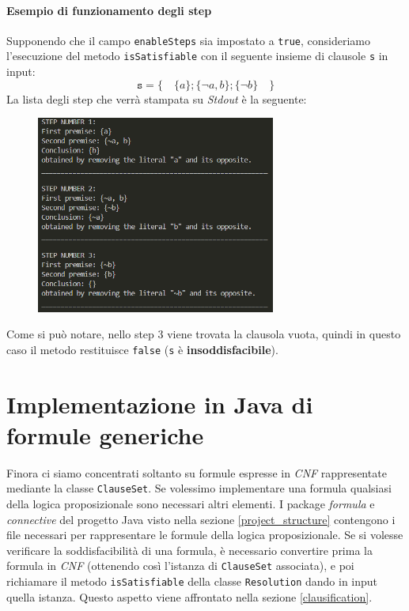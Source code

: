 \documentclass[a4paper,12pt]{report}
\begin{document}
\subsubsection{Esempio di funzionamento degli step}
Supponendo che il campo \texttt{enableSteps} sia impostato a \texttt{true}, consideriamo l'esecuzione del metodo \texttt{isSatisfiable} con il seguente insieme di clausole \texttt{s} in input:
\[\texttt{s} = \{\quad \{a\}; \{\lnot a, b\}; \{\lnot b\} \quad\}\]
La lista degli step che verrà stampata su \emph{Stdout} è la seguente:
\begin{figure}[H]
    \centering
    \includegraphics[width=0.7\textwidth, height=0.4\textheight]{img/step.png}
\end{figure} 
Come si può notare, nello step 3 viene trovata la clausola vuota, quindi in questo caso il metodo restituisce \texttt{false} (\texttt{s} è \textbf{insoddisfacibile}).


% 
% 
\chapter{Implementazione in Java di formule generiche}
\label{formulas}
Finora ci siamo concentrati soltanto su formule espresse in \emph{CNF} rappresentate mediante la classe \texttt{ClauseSet}. Se volessimo implementare una formula qualsiasi della logica proposizionale sono necessari altri elementi. I package \emph{formula} e \emph{connective} del progetto Java visto nella sezione \ref{project_structure} contengono i file necessari per rappresentare le formule della logica proposizionale. Se si volesse verificare la soddisfacibilità di una formula, è necessario convertire prima la formula in \emph{CNF} (ottenendo così l'istanza di \texttt{ClauseSet} associata), e poi richiamare il metodo \texttt{isSatisfiable} della classe \texttt{Resolution} dando in input quella istanza. Questo aspetto viene affrontato nella sezione \ref{clausification}.
\end{document}
